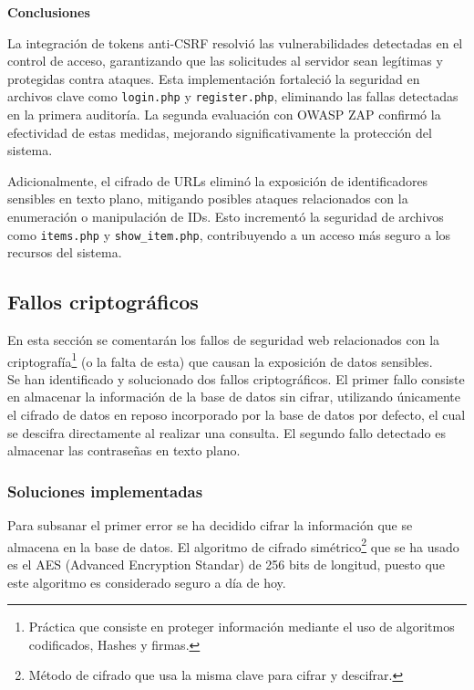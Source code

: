 \documentclass[a4paper,12pt]{article}
\newcommand{\code}[1]{\texttt{#1}}  %
\begin{document}
\vspace{1em}

\textbf{Conclusiones}

La integración de tokens anti-CSRF resolvió las vulnerabilidades detectadas en el control de acceso, garantizando que las solicitudes al servidor sean legítimas y protegidas contra ataques. Esta implementación fortaleció la seguridad en archivos clave como \code{login.php} y \code{register.php}, eliminando las fallas detectadas en la primera auditoría. La segunda evaluación con OWASP ZAP confirmó la efectividad de estas medidas, mejorando significativamente la protección del sistema.

Adicionalmente, el cifrado de URLs eliminó la exposición de identificadores sensibles en texto plano, mitigando posibles ataques relacionados con la enumeración o manipulación de IDs. Esto incrementó la seguridad de archivos como \code{items.php} y \code{show\_item.php}, contribuyendo a un acceso más seguro a los recursos del sistema.

\vspace{1em}

\subsection{Fallos criptográficos}
En esta sección se comentarán los fallos de seguridad web relacionados con la criptografía\footnote{Práctica que consiste en proteger información mediante el uso de algoritmos codificados, Hashes y firmas.} (o la falta de esta) que causan la exposición de datos sensibles\cite{Fallos Criptograficos}.\\ 

Se han identificado y solucionado dos fallos criptográficos. El primer fallo consiste en almacenar la información de la base de datos sin cifrar, utilizando únicamente el cifrado de datos en reposo incorporado por la base de datos por defecto, el cual se descifra directamente al realizar una consulta\cite{MariaDB Cifrado}. El segundo fallo detectado es almacenar las contraseñas en texto plano.


\vspace{1em}
\subsubsection{Soluciones implementadas}
Para subsanar el primer error se ha decidido cifrar la información que se almacena en la base de datos. El algoritmo de cifrado simétrico\footnote{Método de cifrado que usa la misma clave para cifrar y descifrar.} que se ha usado es el AES (Advanced Encryption Standar) de 256 bits de longitud, puesto que este algoritmo es considerado seguro a día de hoy\cite{AES}.\\
\end{document}
